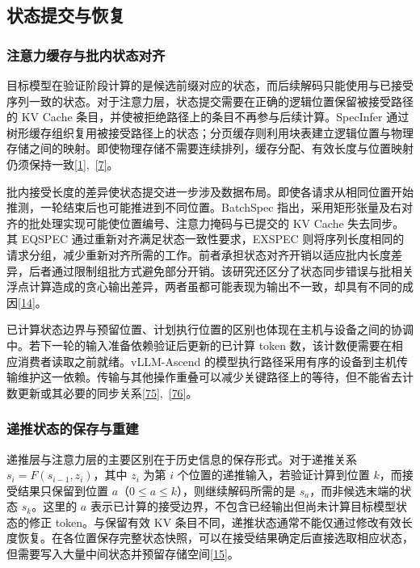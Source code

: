 \documentclass[11pt,a4paper,UTF8,fontset=none,scheme=plain,zihao=-4]{ctexart}
\begin{document}
\hypertarget{section-5-1}{%
\subsection{状态提交与恢复}\label{section-5-1}}

\hypertarget{section-5-1-1}{%
\subsubsection{注意力缓存与批内状态对齐}\label{section-5-1-1}}

目标模型在验证阶段计算的是候选前缀对应的状态，而后续解码只能使用与已接受序列一致的状态。对于注意力层，状态提交需要在正确的逻辑位置保留被接受路径的
KV Cache 条目，并使被拒绝路径上的条目不再参与后续计算。SpecInfer
通过树形缓存组织复用被接受路径上的状态；分页缓存则利用块表建立逻辑位置与物理存储之间的映射。即使物理存储不需要连续排列，缓存分配、有效长度与位置映射仍须保持一致\protect\hyperlink{ref-pagedattention}{{[}1{]}},~\protect\hyperlink{ref-specinfer}{{[}7{]}}。

批内接受长度的差异使状态提交进一步涉及数据布局。即使各请求从相同位置开始推测，一轮结束后也可能推进到不同位置。BatchSpec
指出，采用矩形张量及右对齐的批处理实现可能使位置编号、注意力掩码与已提交的
KV Cache 失去同步。其 EQSPEC 通过重新对齐满足状态一致性要求，EXSPEC
则将序列长度相同的请求分组，减少重新对齐所需的工作。前者承担状态对齐开销以适应批内长度差异，后者通过限制组批方式避免部分开销。该研究还区分了状态同步错误与批相关浮点计算造成的贪心输出差异，两者虽都可能表现为输出不一致，却具有不同的成因\protect\hyperlink{ref-batchspec}{{[}14{]}}。

已计算状态边界与预留位置、计划执行位置的区别也体现在主机与设备之间的协调中。若下一轮的输入准备依赖验证后更新的已计算
token 数，该计数便需要在相应消费者读取之前就绪。vLLM-Ascend
的模型执行路径采用有序的设备到主机传输维护这一依赖。传输与其他操作重叠可以减少关键路径上的等待，但不能省去计数更新或其必要的同步关系\protect\hyperlink{ref-vllm-scheduler}{{[}75{]}},~\protect\hyperlink{ref-ascend-pin}{{[}76{]}}。

\hypertarget{section-5-1-2}{%
\subsubsection{递推状态的保存与重建}\label{section-5-1-2}}

递推层与注意力层的主要区别在于历史信息的保存形式。对于递推关系
\(s_i=F(s_{i-1},z_i)\)，其中 \(z_i\) 为第 \(i\)
个位置的递推输入，若验证计算到位置 \(k\)，而接受结果只保留到位置
\(a\)（\(0\leq a\leq k\)），则继续解码所需的是
\(s_a\)，而非候选末端的状态 \(s_k\)。这里的 \(a\)
表示已计算的接受边界，不包含已经输出但尚未计算目标模型状态的修正
token。与保留有效 KV
条目不同，递推状态通常不能仅通过修改有效长度恢复。在各位置保存完整状态快照，可以在接受结果确定后直接选取相应状态，但需要写入大量中间状态并预留存储空间\protect\hyperlink{ref-replayssm}{{[}15{]}}。
\end{document}
